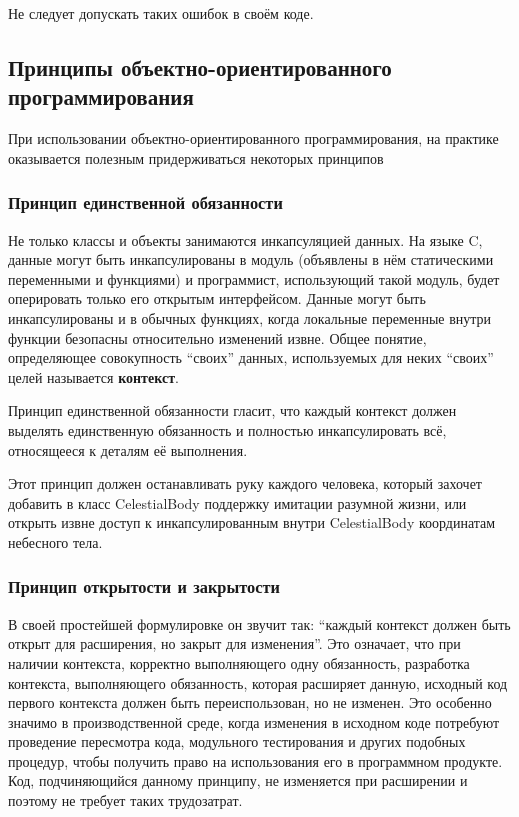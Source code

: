 \documentclass[a4paper,12pt,oneside]{article}
\begin{document}
Не следует допускать таких ошибок в своём коде.

\subsection{Принципы объектно-ориентированного программирования}

При использовании объектно-ориентированного программирования, на практике оказывается полезным придерживаться некоторых принципов

\subsubsection{Принцип единственной обязанности}

Не только классы и объекты занимаются инкапсуляцией данных. На языке C, данные могут быть инкапсулированы в модуль (объявлены в нём статическими переменными и функциями) и программист, использующий такой модуль, будет оперировать только его открытым интерфейсом. Данные могут быть инкапсулированы и в обычных функциях, когда локальные переменные внутри функции безопасны относительно изменений извне. Общее понятие, определяющее совокупность ``своих'' данных, используемых для неких ``своих'' целей называется \textbf{контекст}.

Принцип единственной обязанности гласит, что каждый контекст должен выделять единственную обязанность и полностью инкапсулировать всё, относящееся к деталям её выполнения.

Этот принцип должен останавливать руку каждого человека, который захочет добавить в класс CelestialBody поддержку имитации разумной жизни, или открыть извне доступ к инкапсулированным внутри CelestialBody координатам небесного тела.

\subsubsection{Принцип открытости и закрытости}

В своей простейшей формулировке он звучит так: ``каждый контекст должен быть открыт для расширения, но закрыт для изменения''. Это означает, что при наличии контекста, корректно выполняющего одну обязанность, разработка контекста, выполняющего обязанность, которая расширяет данную, исходный код первого контекста должен быть переиспользован, но не изменен. Это особенно значимо в производственной среде, когда изменения в исходном коде потребуют проведение пересмотра кода, модульного тестирования и других подобных процедур, чтобы получить право на использования его в программном продукте. Код, подчиняющийся данному принципу, не изменяется при расширении и поэтому не требует таких трудозатрат.
\end{document}
